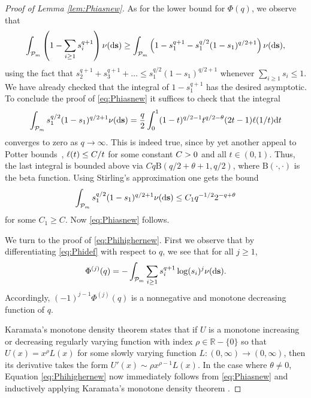 \documentclass[a4,12pt]{amsart}
\numberwithin{equation}{section}
\newcommand{\MassP}{\mathcal{P}_{\rm m}}
\newcommand{\const}{{\rm C}} %
\begin{document}
\begin{appendix}
\begin{proof}[Proof of Lemma \ref{lem:Phiasnew}]
		As for the lower bound for $\Phi(q)$, we observe that
		\begin{equation*}
			\int_{\MassP} \left(1 - \sum_{i \geq 1} s_i^{q+1} \right) \nu(\mathrm{d} \mathbf{s}) \geq  
			\int_{\MassP} \left(1 - s_1^{q+1} - s_1^{q/2}(1-s_1)^{q/2+1}\right) \nu(\mathrm{d} \mathbf{s}),
		\end{equation*}
		using the fact that $s_2^{q+1} + s_3^{q+1} + \ldots \leq s_1^{q/2}(1 - s_1)^{q/2+1}$ whenever 
		$\sum_{ i \geq 1} s_i \leq 1$.
		We have already checked that the integral of $1-s_1^{q+1}$ has the desired asymptotic. 
		To conclude the proof of \eqref{eq:Phiasnew} it suffices to check that 
		the integral 
		\begin{equation*}
			\int_{\MassP} s_1^{q/2}(1-s_1)^{q/2+1} \nu(\mathrm{ d} \mathbf{s}) =
			\frac q2\int_0^1 (1-t)^{q/2-1}t^{q/2-\theta}(2t-1)\ell(1/t) \mathrm{d} t 
		\end{equation*}
		converges to zero as $q \to \infty$. This is indeed true, since by yet another appeal to 
		Potter bounds~\cite[Theorem 1.5.6 (ii)]{bingham1989regular},  
		$\ell(t) \leq \const /t$ for some constant $\const>0$ and all $t \in (0,1)$. 
		Thus, the last integral is bounded above via
		$Cq \mathrm{B}(q/2+\theta +1, q/2)$, where $\mathrm{B}(\cdot, \cdot)$ is the beta function. Using Stirling's approximation one 
        gets the bound
        \begin{equation}\label{eq:fancy}
        \int_{\MassP} s_1^{q/2}(1-s_1)^{q/2+1} \nu(\mathrm{ d} \mathbf{s}) \leq C_1 q^{-1/2} 2^{-q+\theta}
        \end{equation}
        for some $C_1 \geq C$.
        Now \eqref{eq:Phiasnew} follows.\medskip


We turn to the proof of \eqref{eq:Phihighernew}. 
First we observe that by differentiating \eqref{eq:Phidef} with respect to $q$, we see that for all $j \geq 1$, 
\begin{align} \label{eq:der}
\Phi^{(j)}(q) = - \int_{\MassP} \sum_{i \geq 1} s_i^{q+1} \log(s_i)^{j} \nu(\mathrm{d}\mathbf{s}).
\end{align}
Accordingly, $(-1)^{j-1}\Phi^{(j)}(q)$ is a nonnegative and monotone decreasing function of $q$. 

Karamata's monotone density theorem \cite[Theorem 1.7.2]{bingham1989regular} states that if $U$ is a monotone increasing or decreasing regularly varying function with index $\rho \in \mathbb{R} - \{0\}$ so that $U(x) = x^\rho L(x)$ for some slowly varying function $L:(0,\infty) \to (0,\infty)$, then its derivative takes the form $U'(x) \sim \rho x^{\rho-1}L(x)$. 
In the case where $\theta \neq 0$, Equation \eqref{eq:Phihighernew} now immediately follows from \eqref{eq:Phiasnew} and inductively applying Karamata's monotone density theorem \cite[Theorem 1.7.2]{bingham1989regular}.


\end{proof}
\end{appendix}
\end{document}
